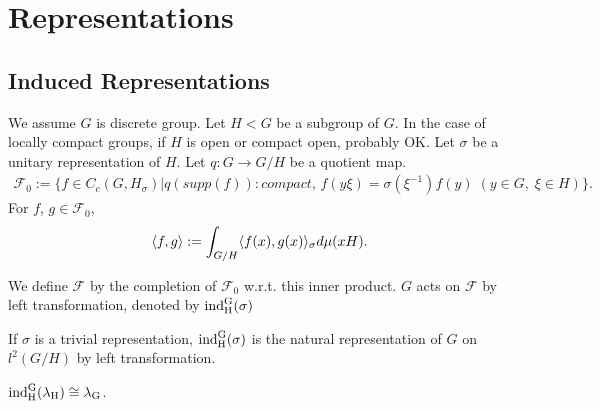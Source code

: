\section{Representations}

\subsection{Induced Representations}
We assume $G$ is discrete group.
Let $H < G$ be a subgroup of $G$.
In the case of locally compact groups, if $H$ is open or compact open, probably OK.
Let $\sigma$ be a unitary representation of $H$.
Let $q:G \rightarrow G/H$ be a quotient map.
\begin{align*}
  \mathcal{F}_0 := \{f \in C_c(G,H_\sigma) | q(supp(f)):compact,\, f(y \xi) = \sigma(\xi^{-1})f(y) \; (y \in G,\; \xi \in H)\}.
\end{align*}
For $f$, $g \in \mathcal{F}_0$,
\begin{align*}
  \langle f,g\rangle := \int_{G/H}\langle f(x),g(x)\rangle_\sigma d \mu(xH).
\end{align*}

We define $\mathcal{F}$ by the completion of $\mathcal{F}_0$ w.r.t. this inner product.
$G$ acts on $\mathcal{F}$ by left transformation, denoted by $\rm{ind}_H^G(\sigma)$
\begin{remark}
  If $\sigma$ is a trivial representation, $\rm{ind}_H^G(\sigma)$ is the natural representation of $G$ on $l^2(G/H)$ by left transformation.
\end{remark}
\begin{proposition}
  $\rm{ind}_H^G(\lambda_H) \cong \lambda_G$.
\end{proposition}

